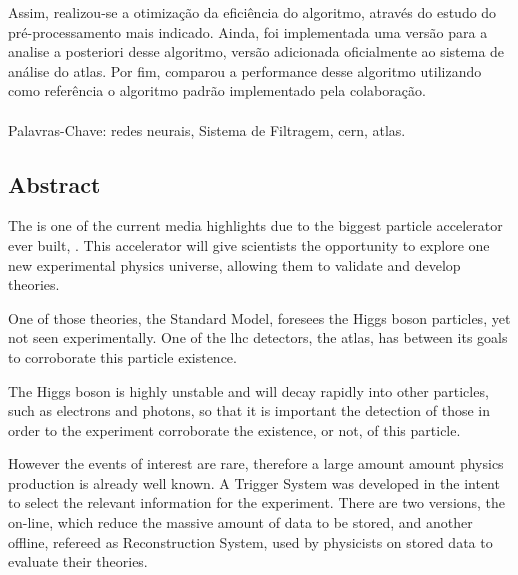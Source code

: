 Assim, realizou-se a otimização da eficiência do algoritmo, 
através do estudo do pré-processamento mais indicado. 
Ainda, foi implementada uma versão para a analise 
a posteriori desse algoritmo, versão adicionada oficialmente ao
sistema de análise do \gls{atlas}. Por fim, comparou a performance desse algoritmo 
utilizando como referência o algoritmo padrão implementado pela colaboração.

\paragraph*{}

\noindent Palavras-Chave:  redes neurais, Sistema de Filtragem, \acrshort{cern},
  \acrshort{atlas}.

\vfill

\cleardoublepage

\vfill
\begin{center}
\section*{Abstract\label{Abstract}}
\end{center}

The  is one of the current
media highlights due to the biggest particle accelerator ever built, . This accelerator will give scientists the opportunity to explore 
one new experimental physics universe, allowing them to validate and develop
theories.

One of those theories, the Standard Model, foresees the Higgs boson particles,
yet not seen experimentally. One of the \acrshort{lhc} detectors, the
\gls{atlas}, has between its goals to corroborate this particle existence.

The Higgs boson is highly unstable and will decay rapidly into other particles,
such as electrons and photons, so that it is important the detection of those in 
order to the experiment corroborate the existence, or not, of this particle.

However the events of interest are rare, therefore a large amount amount physics
production is already well known. A Trigger System was developed in the
intent to select the relevant information for the experiment. There are two
versions, the on-line, which reduce the massive amount of data
to be stored, and another offline, refereed as Reconstruction System, used by 
physicists on stored data to evaluate their theories.

